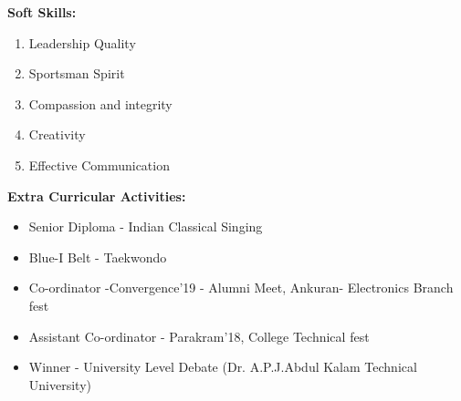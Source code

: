 \documentclass {article}
\begin{document}
\begin {flushleft} \Large \textbf{ Soft Skills:} \end{flushleft}
	\begin {enumerate}
		\item Leadership Quality
		\item Sportsman Spirit
		\item Compassion and integrity
		\item Creativity
		\item Effective Communication
	\end {enumerate}
\begin {flushleft} \Large \textbf{ Extra Curricular Activities:} \end{flushleft}
	\begin {itemize}
		\item Senior Diploma - Indian Classical Singing
		\item Blue-I Belt - Taekwondo
		\item Co-ordinator -Convergence'19 - Alumni Meet, Ankuran- Electronics Branch fest
		\item Assistant Co-ordinator - Parakram'18, College Technical fest 
		\item Winner - University Level Debate (Dr. A.P.J.Abdul Kalam Technical University)
	\end {itemize}
\end{document}
